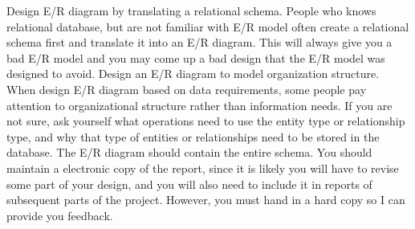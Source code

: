 \documentclass[11pt]{article}
\begin{document}
    Design E/R diagram by translating a relational schema. People who
    knows relational database, but are not familiar with E/R model often
    create a relational schema first and translate it into an E/R
    diagram. This will always give you a bad E/R model and you may come up
    a bad design that the E/R model was designed to avoid.  Design an E/R
    diagram to model organization structure. When design E/R diagram based
    on data requirements, some people pay attention to organizational
    structure rather than information needs. If you are not sure, ask
    yourself what operations need to use the entity type or relationship
    type, and why that type of entities or relationships need to be stored
    in the database.  The E/R diagram should contain the entire schema.
    You should maintain a electronic copy of the report, since it is
    likely you will have to revise some part of your design, and you will
    also need to include it in reports of subsequent parts of the
    project. However, you must hand in a hard copy so I can provide you
    feedback.
    
\end{document}
